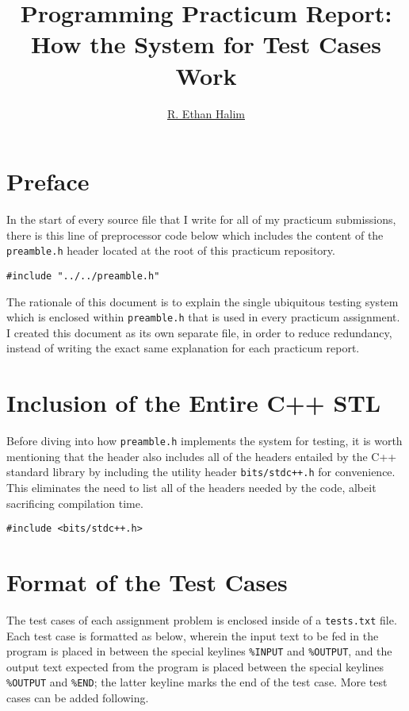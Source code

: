 \documentclass[12pt]{article}
\title{Programming Practicum Report: \\ How the System for Test Cases Work}
\author{\href{https://github.com/avaxar}{R. Ethan Halim}}
\date{}
\begin{document}
\maketitle

\section{Preface}

In the start of every source file that I write for all of my practicum submissions, there is this line of preprocessor code below which includes the content of the \texttt{preamble.h} header located at the root of this practicum repository.

\begin{verbatim}
#include "../../preamble.h"
\end{verbatim}

The rationale of this document is to explain the single ubiquitous testing system which is enclosed within \texttt{preamble.h} that is used in every practicum assignment. I created this document as its own separate file, in order to reduce redundancy, instead of writing the exact same explanation for each practicum report.

\section{Inclusion of the Entire C++ STL}

Before diving into how \texttt{preamble.h} implements the system for testing, it is worth mentioning that the header also includes all of the headers entailed by the C++ standard library by including the utility header \texttt{bits/stdc++.h} for convenience. This eliminates the need to list all of the headers needed by the code, albeit sacrificing compilation time.

\begin{verbatim}
#include <bits/stdc++.h>
\end{verbatim}

\pagebreak
\section{Format of the Test Cases}

The test cases of each assignment problem is enclosed inside of a \texttt{tests.txt} file. Each test case is formatted as below, wherein the input text to be fed in the program is placed in between the special keylines \texttt{\%INPUT} and \texttt{\%OUTPUT}, and the output text expected from the program is placed between the special keylines \texttt{\%OUTPUT} and \texttt{\%END}; the latter keyline marks the end of the test case. More test cases can be added following.
\end{document}
